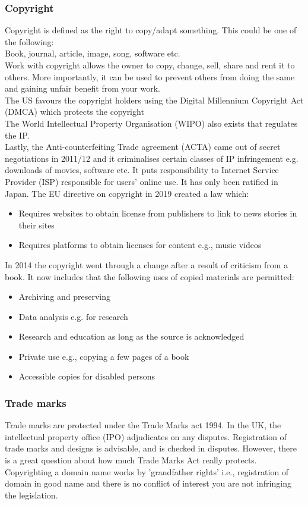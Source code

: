 \documentclass[a4paper]{article}
\theoremstyle{plain}
\theoremstyle{definition}
\theoremstyle{remark}
\begin{document}
\subsubsection{Copyright}
Copyright is defined as the right to copy/adapt something. This could be one of the following:\\
Book, journal, article, image, song, software etc. \\
Work with copyright allows the owner to copy, change, sell, share and rent it to others. More importantly, it can be used to prevent others from doing the same and gaining unfair benefit from your work. \\
The US favours the copyright holders using the Digital Millennium Copyright Act (DMCA) which protects the copyright \\
The World Intellectual Property Organisation (WIPO) also exists that regulates the IP. \\
Lastly, the Anti-counterfeiting Trade agreement (ACTA) came out of secret negotiations in 2011/12 and it criminalises certain classes of IP infringement e.g. downloads of movies, software etc. It puts responsibility to Internet Service Provider (ISP) responsible for users' online use. It has only been ratified in Japan.
The EU directive on copyright in 2019 created a law which:
\begin{itemize}
	\item Requires websites to obtain license from publishers to link to news stories in their sites
	\item Requires platforms to obtain licenses for content e.g., music videos
\end{itemize}
In 2014 the copyright went through a change after a result of criticism from a book. It now includes that the following uses of copied materials are permitted:
\begin{itemize}
	\item Archiving and preserving
	\item Data analysis e.g. for research
	\item Research and education as long as the source is acknowledged
	\item Private use e.g., copying a few pages of a book
	\item Accessible copies for disabled persons
\end{itemize}
\subsubsection{Trade marks}
Trade marks are protected under the Trade Marks act 1994. In the UK, the intellectual property office (IPO) adjudicates on any disputes. Registration of trade marks and designs is advisable, and is checked in disputes. However, there is a great question about how much Trade Marks Act really protects. Copyrighting a domain name works by 'grandfather rights' i.e., registration of domain in good name and there is no conflict of interest you are not infringing the legislation.
\end{document}
